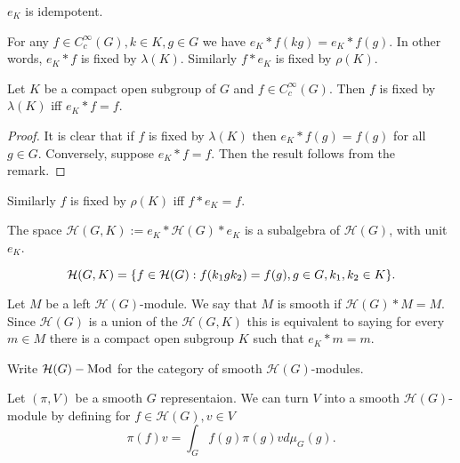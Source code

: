\documentclass{memoir}
\begin{document}
\begin{remark}
    $e_K$ is idempotent.
\end{remark}
\begin{remark}
    For any $f\in C_c^\infty(G), k\in K, g\in G$ we have $e_K*f(kg) = e_K*f(g)$.
    In other words, $e_K*f$ is fixed by $\lambda(K)$.
    Similarly $f*e_K$ is fixed by $\rho(K)$.
\end{remark}
\begin{proposition}
    Let $K$ be a compact open subgroup of $G$ and $f\in C_c^\infty(G)$.
    Then $f$ is fixed by $\lambda(K)$ iff $e_K*f = f$.
\end{proposition}
\begin{proof}
    It is clear that if $f$ is fixed by $\lambda(K)$ then $e_K*f(g) = f(g)$ for all $g\in G$.
    Conversely, suppose $e_K*f = f$.
    Then the result follows from the remark.
\end{proof}
\begin{remark}
    Similarly $f$ is fixed by $\rho(K)$ iff $f*e_K = f$.
\end{remark}
\begin{corollary}
    The space $\mathcal H(G,K) := e_K*\mathcal H(G)*e_K$ is a subalgebra of $\mathcal H(G)$, with unit $e_K$.
\end{corollary}
\begin{corollary}
    \begin{equation}
        \mathcal H(G,K) = \lbrace f\in \mathcal H(G): f(k_1gk_2) = f(g), g\in G,k_1,k_2\in K\rbrace.
    \end{equation}
\end{corollary}
\begin{definition}
    Let $M$ be a left $\mathcal H(G)$-module.
    We say that $M$ is smooth if $\mathcal H(G)*M = M$.
    Since $\mathcal H(G)$ is a union of the $\mathcal H(G,K)$ this is equivalent to saying for every $m\in M$ there is a compact open subgroup $K$ such that $e_K*m = m$.

    Write $\mathcal H(G)-\text{Mod}$ for the category of smooth $\mathcal H(G)$-modules.
\end{definition}
\begin{definition}
    Let $(\pi,V)$ be a smooth $G$ representaion.
    We can turn $V$ into a smooth $\mathcal H(G)$-module by defining for $f\in \mathcal H(G), v\in V$
    \begin{equation}
        \pi(f)v = \int_Gf(g)\pi(g)vd\mu_G(g).
    \end{equation}
\end{definition}
\end{document}
